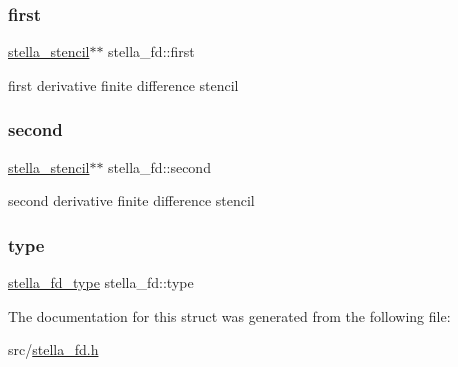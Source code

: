 \subsubsection{\texorpdfstring{first}{first}}
{\footnotesize\ttfamily \mbox{\hyperlink{structstella__stencil}{stella\+\_\+stencil}}$\ast$$\ast$ stella\+\_\+fd\+::first}



first derivative finite difference stencil 

\mbox{\label{structstella__fd_a8ee0850edffa0b584f7fec78e07f905c}} 
\subsubsection{\texorpdfstring{second}{second}}
{\footnotesize\ttfamily \mbox{\hyperlink{structstella__stencil}{stella\+\_\+stencil}}$\ast$$\ast$ stella\+\_\+fd\+::second}



second derivative finite difference stencil 

\mbox{\label{structstella__fd_aed24907996901e2ea3c6cfd10d9d6bd1}} 
\subsubsection{\texorpdfstring{type}{type}}
{\footnotesize\ttfamily \mbox{\hyperlink{stella__fd_8h_adcce97872fa6093ccd0f766114685feb}{stella\+\_\+fd\+\_\+type}} stella\+\_\+fd\+::type}



The documentation for this struct was generated from the following file\+:\begin{DoxyCompactItemize}
\item 
src/\mbox{\hyperlink{stella__fd_8h}{stella\+\_\+fd.\+h}}\end{DoxyCompactItemize}
